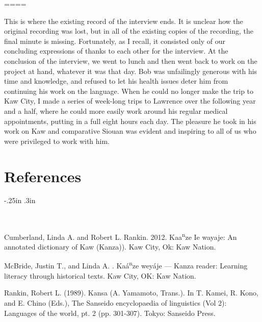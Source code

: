 \documentclass[output=paper]{LSP/langsci}
\begin{document}
====

\noindent This is where the existing record of the interview ends. It is unclear how the original recording was lost, but in all of the existing copies of the recording, the final minute is missing. Fortunately, as I recall, it consisted only of our concluding expressions of thanks to each other for the interview. At the conclusion of the interview, we went to lunch and then went back to work on the project at hand, whatever it was that day. Bob was unfailingly generous with his time and knowledge, and refused to let his health issues deter him from continuing his work on the language. When he could no longer make the trip to Kaw City, I made a series of week-long trips to Lawrence over the following year and a half, where he could more easily work around his regular medical appointments, putting in a full eight hours each day. The pleasure he took in his work on Kaw and comparative Siouan was evident and inspiring to all of us who were privileged to work with him. 

\section*{References}

\newenvironment{reflist} {\begin{list} {} {\listparindent -.25in
\leftmargin .3in} \item \ \vspace{-.3in} } {\end{list} }

\begin{reflist}

Cumberland, Linda A. and Robert L. Rankin. 2012. Kaa\textsuperscript{n}ze Ie wayaje: An annotated dictionary of Kaw (Kanza)). Kaw City, Ok: Kaw Nation.

McBride, Justin T., and Linda A. \citet{Cumberland2010}. Ka\'a\textsuperscript{n}ze wey\'aje --- Kanza reader: Learning literacy through historical texts. Kaw City, OK: Kaw Nation.

Rankin, Robert L. (1989). Kansa (A. Yamamoto, Trans.). In T. Kamei, R. Kono, and E. Chino (Eds.), The Sanseido encyclopaedia of linguistics (Vol 2): Languages of the world, pt. 2 (pp. 301-307). Tokyo: Sanseido Press.
\end{reflist}
\end{document}
